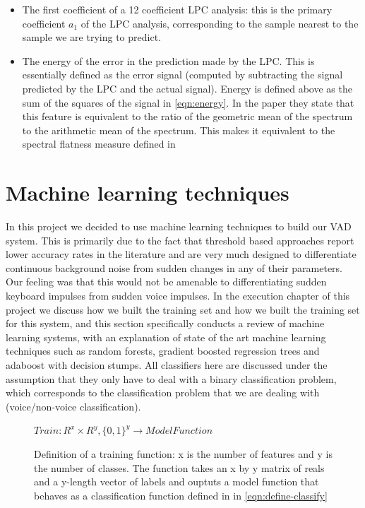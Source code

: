 \documentclass[ %
                    author={Sam Phippen},
                supervisor={Dr. Rafal Bogacz},
                     title={Real time voice activity detectors in noisy personal computing environments},
                  subtitle={},
                    degree={MEng},
                      year={2012} ]{thesis}
\begin{document}
\begin{itemize}

    \item The first coefficient of a 12 coefficient LPC analysis: this is the
        primary coefficient $a_1$ of the LPC analysis, corresponding to the
        sample nearest to the sample we are trying to predict.

    \item The energy of the error in the prediction made by the LPC. This is
        essentially defined as the error signal (computed by subtracting the
        signal predicted by the LPC and the actual signal). Energy is defined
        above as the sum of the squares of the signal in \ref{eqn:energy}. In
        the paper they state that this feature is equivalent to the ratio of
        the geometric mean of the spectrum to the arithmetic mean of the
        spectrum.  This makes it equivalent to the spectral flatness measure
        defined in \cite{moattar}

\end{itemize}

\section{Machine learning techniques}

In this project we decided to use machine learning techniques to build our VAD
system. This is primarily due to the fact that threshold based approaches
report lower accuracy rates in the literature and are very much designed to
differentiate continuous background noise from sudden changes in any of their
parameters. Our feeling was that this would not be amenable to differentiating
sudden keyboard impulses from sudden voice impulses. In the execution chapter
of this project we discuss how we built the training set and how we built the
training set for this system, and this section specifically conducts a review
of machine learning systems, with an explanation of state of the art machine
learning techniques such as random forests, gradient boosted regression trees
and adaboost with decision stumps. All classifiers here are discussed under the
assumption that they only have to deal with a binary classification problem,
which corresponds to the classification problem that we are dealing with
(voice/non-voice classification).

\begin{figure}
    $Train:R^x \times R^y, \{0,1\}^y \rightarrow ModelFunction$

    \caption{Definition of a training function: x is the number of features and
        y is the number of classes. The function takes an x by y matrix of
        reals and a y-length vector of labels and ouptuts a model function that
        behaves as a classification function defined in in
    \ref{eqn:define-classify} }

    \label{eqn:define-train}
\end{figure}
\end{document}
